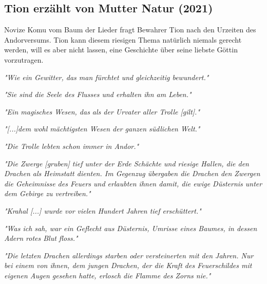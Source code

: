 \begin{chapterbox}
    \chapter{Tion erzählt von Mutter Natur (2021)}
    \label{Tion erzählt von Mutter Natur (2021)}
    Novize Komu vom Baum der Lieder fragt Bewahrer Tion nach den Urzeiten des Andorversums. Tion kann diesem riesigen Thema natürlich niemals gerecht werden, will es aber nicht lassen, eine Geschichte über seine liebste Göttin vorzutragen.
\end{chapterbox}


\textit{"Wie ein Gewitter, das man fürchtet und gleichzeitig bewundert."}

\trennzeichen

\textit{"Sie sind die Seele des Flusses und erhalten ihn am Leben."}

\trennzeichen

\textit{"Ein magisches Wesen, das als der Urvater aller Trolle [gilt]."}

\trennzeichen

\textit{"[...]dem wohl mächtigsten Wesen der ganzen südlichen Welt."}

\trennzeichen

\textit{"Die Trolle lebten schon immer in Andor."}

\trennzeichen

\textit{"Die Zwerge [gruben] tief unter der Erde Schächte und riesige Hallen, die den Drachen als Heimstatt dienten. Im Gegenzug übergaben die Drachen den Zwergen die Geheimnisse des Feuers und erlaubten ihnen damit, die ewige Düsternis unter dem Gebirge zu vertreiben."}

\trennzeichen

\textit{"Krahal [...] wurde vor vielen Hundert Jahren tief erschüttert."}

\trennzeichen

\textit{"Was ich sah, war ein Geflecht aus Düsternis, Umrisse eines Baumes, in dessen Adern rotes Blut floss."}

\trennzeichen

\textit{"Die letzten Drachen allerdings starben oder versteinerten mit den Jahren. Nur bei einem von ihnen, dem jungen Drachen, der die Kraft des Feuerschildes mit eigenen Augen gesehen hatte, erlosch die Flamme des Zorns nie."}

\trennzeichen

